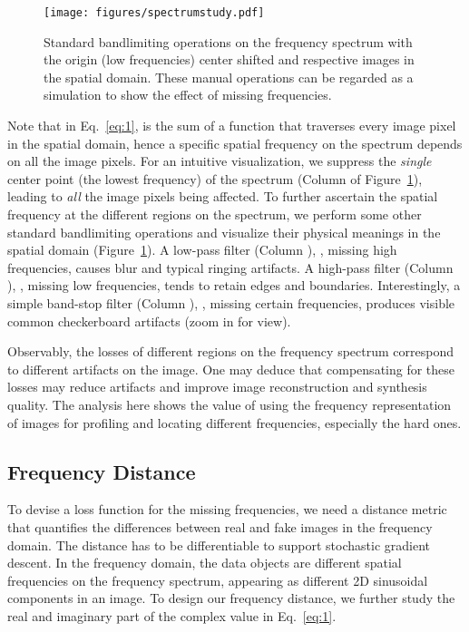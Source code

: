 \documentclass[10pt,twocolumn,letterpaper]{article}
\begin{document}
\begin{figure}[t]
	\centering
\texttt{[image: figures/spectrumstudy.pdf]}
\caption{Standard bandlimiting operations on the frequency spectrum with the origin (low frequencies) center shifted and respective images in the spatial domain. These manual operations can be regarded as a simulation to show the effect of missing frequencies.}
	\label{fig:spectrumstudy}
	\vspace{-0.35cm}
\end{figure}


Note that in Eq.~\eqref{eq:1},  is the sum of a function that traverses every image pixel in the spatial domain, hence a specific spatial frequency on the spectrum depends on all the image pixels.
For an intuitive visualization, we suppress the \textit{single} center point (the lowest frequency) of the spectrum (Column  of Figure~\ref{fig:spectrumstudy}), leading to \textit{all} the image pixels being affected.
To further ascertain the spatial frequency at the different regions on the spectrum, we perform some other standard bandlimiting operations and visualize their physical meanings in the spatial domain (Figure~\ref{fig:spectrumstudy}).
A low-pass filter (Column ), \ie, missing high frequencies, causes blur and typical ringing artifacts. A high-pass filter (Column ), \ie, missing low frequencies, tends to retain edges and boundaries. Interestingly, a simple band-stop filter (Column ), \ie, missing certain frequencies, produces visible common checkerboard artifacts (zoom in for view).

Observably, the losses of different regions on the frequency spectrum correspond to different artifacts on the image.
One may deduce that compensating for these losses may reduce artifacts and improve image reconstruction and synthesis quality.
The analysis here shows the value of using the frequency representation of images for profiling and locating different frequencies, especially the hard ones.





\subsection{Frequency Distance}
\label{sec:freqdist}

To devise a loss function for the missing frequencies, we need a distance metric that quantifies the differences between real and fake images in the frequency domain. The distance has to be differentiable to support stochastic gradient descent.
In the frequency domain, the data objects are different spatial frequencies on the frequency spectrum, appearing as different 2D sinusoidal components in an image.
To design our frequency distance, we further study the real and imaginary part of the complex value  in Eq.~\eqref{eq:1}.
\end{document}
